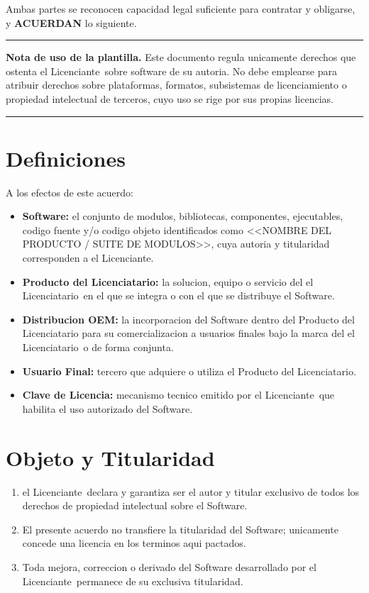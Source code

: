 \documentclass[11pt,a4paper]{article}
\newcommand{\LicencianteAbrev}{el Licenciante}
\newcommand{\LicenciatarioAbrev}{el Licenciatario}
\newcommand{\Producto}{<<NOMBRE DEL PRODUCTO / SUITE DE MODULOS>>}
\begin{document}
\noindent Ambas partes se reconocen capacidad legal suficiente para contratar y obligarse,
y \textbf{ACUERDAN} lo siguiente.

\vspace{0.8em}
\hrule
\vspace{0.4em}
{\footnotesize\color{tenue}\textbf{Nota de uso de la plantilla.} Este documento regula
unicamente derechos que ostenta \LicencianteAbrev\ sobre software de su autoria. No debe
emplearse para atribuir derechos sobre plataformas, formatos, subsistemas de licenciamiento
o propiedad intelectual de terceros, cuyo uso se rige por sus propias licencias.}
\vspace{0.4em}
\hrule

\section{Definiciones}
A los efectos de este acuerdo:
\begin{itemize}
  \item \textbf{Software:} el conjunto de modulos, bibliotecas, componentes, ejecutables,
        codigo fuente y/o codigo objeto identificados como \Producto, cuya autoria y
        titularidad corresponden a \LicencianteAbrev.
  \item \textbf{Producto del Licenciatario:} la solucion, equipo o servicio del
        \LicenciatarioAbrev\ en el que se integra o con el que se distribuye el Software.
  \item \textbf{Distribucion OEM:} la incorporacion del Software dentro del Producto del
        Licenciatario para su comercializacion a usuarios finales bajo la marca del
        \LicenciatarioAbrev\ o de forma conjunta.
  \item \textbf{Usuario Final:} tercero que adquiere o utiliza el Producto del Licenciatario.
  \item \textbf{Clave de Licencia:} mecanismo tecnico emitido por \LicencianteAbrev\ que
        habilita el uso autorizado del Software.
\end{itemize}

\section{Objeto y Titularidad}
\begin{enumerate}
  \item \LicencianteAbrev\ declara y garantiza ser el autor y titular exclusivo de todos
        los derechos de propiedad intelectual sobre el Software.
  \item El presente acuerdo no transfiere la titularidad del Software; unicamente concede
        una licencia en los terminos aqui pactados.
  \item Toda mejora, correccion o derivado del Software desarrollado por \LicencianteAbrev\
        permanece de su exclusiva titularidad.
\end{enumerate}
\end{document}
